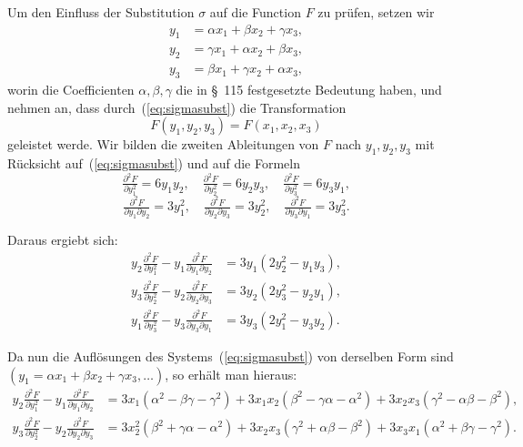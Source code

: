 \documentclass[12pt,a4paper]{article}
\begin{document}
Um den Einfluss der Substitution $\sigma$ auf die Function $F$ zu pr\"ufen, setzen wir
\begin{equation}
\label{eq:sigmasubst} \begin{aligned} y_1 &= \alpha x_1 + \beta x_2 + \gamma x_3,\\ y_2 &= \gamma x_1 + \alpha x_2 + \beta x_3,\\ y_3 &= \beta x_1 + \gamma x_2 + \alpha x_3, \end{aligned}
\end{equation}
worin die Coefficienten $\alpha, \beta, \gamma$ die in \S~115 festgesetzte Bedeutung haben, und nehmen an, dass durch~(\ref{eq:sigmasubst}) die Transformation
\begin{equation}
\label{eq:Ftrafo} F(y_1, y_2, y_3) = F(x_1, x_2, x_3)
\end{equation}
geleistet werde. Wir bilden die zweiten Ableitungen von $F$ nach $y_1, y_2, y_3$ mit R\"ucksicht auf~(\ref{eq:sigmasubst}) und auf die Formeln
\[\tfrac{\partial^2 F}{\partial y_1^2} = 6y_1 y_2, \quad \tfrac{\partial^2 F}{\partial y_2^2} = 6y_2 y_3, \quad \tfrac{\partial^2 F}{\partial y_3^2} = 6y_3 y_1,\]
\[\tfrac{\partial^2 F}{\partial y_1 \partial y_2} = 3y_1^2, \quad \tfrac{\partial^2 F}{\partial y_2 \partial y_3} = 3y_2^2, \quad \tfrac{\partial^2 F}{\partial y_3 \partial y_1} = 3y_3^2.\]

Daraus ergiebt sich:
\begin{align*}
y_2 \tfrac{\partial^2 F}{\partial y_1^2} - y_1 \tfrac{\partial^2 F}{\partial y_1 \partial y_2} &= 3y_1(2y_2^2 - y_1 y_3),\\
y_3 \tfrac{\partial^2 F}{\partial y_2^2} - y_2 \tfrac{\partial^2 F}{\partial y_2 \partial y_3} &= 3y_2(2y_3^2 - y_2 y_1),\\
y_1 \tfrac{\partial^2 F}{\partial y_3^2} - y_3 \tfrac{\partial^2 F}{\partial y_3 \partial y_1} &= 3y_3(2y_1^2 - y_3 y_2).
\end{align*}

Da nun die Aufl\"osungen des Systems~(\ref{eq:sigmasubst}) von derselben Form sind $(y_1 = \alpha x_1 + \beta x_2 + \gamma x_3, \ldots)$, so erh\"alt man hieraus:
\begin{align*}
y_2 \tfrac{\partial^2 F}{\partial y_1^2} - y_1 \tfrac{\partial^2 F}{\partial y_1 \partial y_2} &= 3x_1(\alpha^2 - \beta\gamma - \gamma^2) + 3x_1 x_2(\beta^2 - \gamma\alpha - \alpha^2) + 3x_2 x_3(\gamma^2 - \alpha\beta - \beta^2),\\
y_3 \tfrac{\partial^2 F}{\partial y_2^2} - y_2 \tfrac{\partial^2 F}{\partial y_2 \partial y_3} &= 3x_2^2(\beta^2 + \gamma\alpha - \alpha^2) + 3x_2 x_3(\gamma^2 + \alpha\beta - \beta^2) + 3x_3 x_1(\alpha^2 + \beta\gamma - \gamma^2).
\end{align*}
\end{document}
